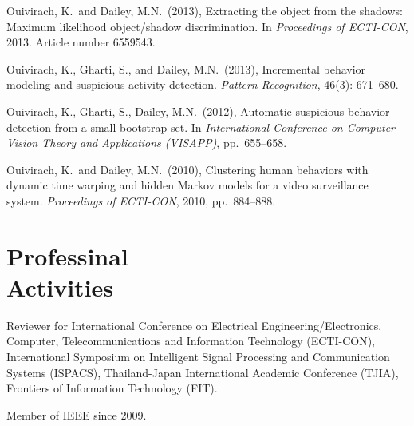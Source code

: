 \documentclass[margin, 10pt]{res}
\begin{document}
\begin{resume}
Ouivirach, K.\ and Dailey, M.N.\ (2013), Extracting the object from the shadows:
Maximum likelihood object/shadow discrimination. In {\it Proceedings of
ECTI-CON}, 2013. Article number 6559543.

Ouivirach, K., Gharti, S., and Dailey, M.N.\ (2013), Incremental behavior
modeling  and suspicious activity detection. {\it Pattern Recognition}, 46(3):
671--680.

Ouivirach, K., Gharti, S., Dailey, M.N.\ (2012), Automatic suspicious behavior
detection from a small bootstrap set. In {\it International Conference on
Computer Vision Theory and Applications (VISAPP)}, pp.\ 655--658.

Ouivirach, K.\ and Dailey, M.N.\ (2010), Clustering human behaviors with
dynamic time warping and hidden Markov models for a video surveillance system.
{\it Proceedings of ECTI-CON}, 2010, pp.\ 884--888.

\section{Professinal \\ Activities}

Reviewer for International Conference on Electrical Engineering/Electronics,
Computer, Telecommunications and Information Technology (ECTI-CON),
International Symposium on Intelligent Signal Processing and Communication
Systems (ISPACS), Thailand-Japan International Academic Conference (TJIA),
Frontiers of Information Technology (FIT).

Member of IEEE since 2009.

\end{resume}
\end{document}
